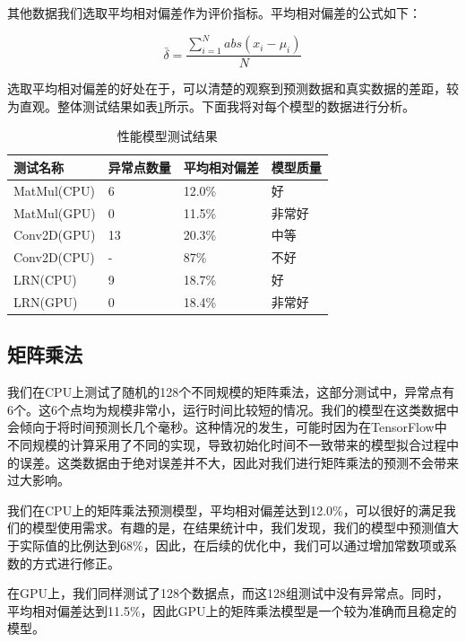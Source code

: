     其他数据我们选取平均相对偏差作为评价指标。平均相对偏差的公式如下：
    
    $$
        \bar{\delta} = \frac{\sum_{i=1}^N abs(x_i - \mu_i)}{N}
    $$
    
    选取平均相对偏差的好处在于，可以清楚的观察到预测数据和真实数据的差距，较为直观。整体测试结果如表\ref{tab:model}所示。下面我将对每个模型的数据进行分析。

    \begin{table}[!htbp]
        \centering
	    \caption{性能模型测试结果}
        \label{tab:model}
        \begin{tabular}{|l|l|l|l|}
            \hline
            测试名称 & 异常点数量 & 平均相对偏差 & 模型质量 \\
            \hline
            MatMul(CPU) & 6 & 12.0\% & 好 \\
            \hline
            MatMul(GPU) & 0 & 11.5\% & 非常好 \\
            \hline
            Conv2D(GPU) & 13 & 20.3\% & 中等 \\
            \hline
            Conv2D(CPU) & - & 87\% & 不好 \\
            \hline
            LRN(CPU) & 9 & 18.7\% & 好 \\
            \hline
            LRN(GPU) & 0 & 18.4\% & 非常好 \\
            \hline
        \end{tabular}
    \end{table}

\subsection{矩阵乘法}
    我们在CPU上测试了随机的128个不同规模的矩阵乘法，这部分测试中，异常点有6个。这6个点均为规模非常小，运行时间比较短的情况。我们的模型在这类数据中会倾向于将时间预测长几个毫秒。这种情况的发生，可能时因为在TensorFlow中不同规模的计算采用了不同的实现，导致初始化时间不一致带来的模型拟合过程中的误差。这类数据由于绝对误差并不大，因此对我们进行矩阵乘法的预测不会带来过大影响。
    
    我们在CPU上的矩阵乘法预测模型，平均相对偏差达到12.0\%，可以很好的满足我们的模型使用需求。有趣的是，在结果统计中，我们发现，我们的模型中预测值大于实际值的比例达到68\%，因此，在后续的优化中，我们可以通过增加常数项或系数的方式进行修正。

    在GPU上，我们同样测试了128个数据点，而这128组测试中没有异常点。同时，平均相对偏差达到11.5\%，因此GPU上的矩阵乘法模型是一个较为准确而且稳定的模型。

